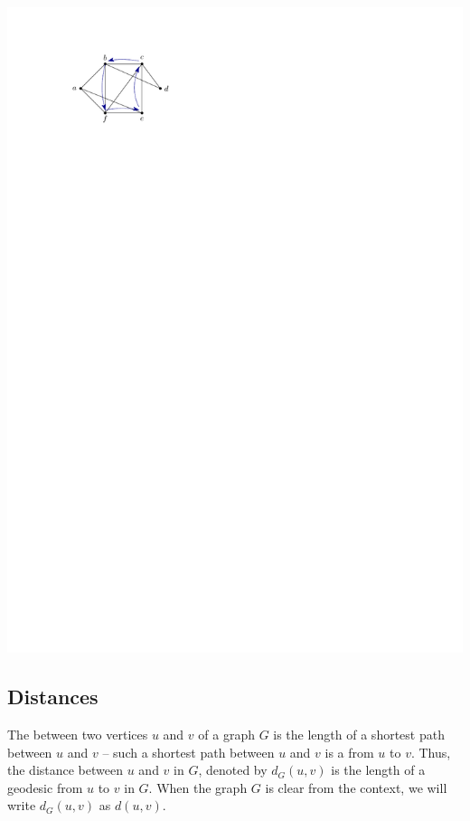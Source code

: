 \begin{Example}
\begin{center}
\includegraphics{Images/Cycle1.pdf}
\end{center}
\end{Example}

\subsection{Distances}\label{subsec:Distances}

The  between two vertices $u$ and $v$ of a graph $G$ is the length of a shortest path between $u$ and $v$ -- such a shortest path between $u$ and $v$ is a  from $u$ to $v$. Thus, the distance between $u$ and $v$ in $G$, denoted by $d_G(u, v)$ is the length of a geodesic from $u$ to $v$ in $G$. When the graph $G$ is clear from the context, we will write $d_G(u, v)$ as $d(u, v)$.

